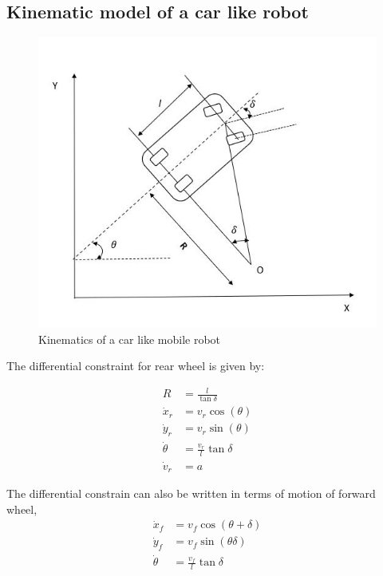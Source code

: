 \documentclass[11]{article}
\begin{document}
\subsection{Kinematic model of a car like robot}


\begin{figure}[!ht]
	\centering
	\includegraphics[scale= 0.5]{vehicle_model.png}
	\caption{Kinematics of a car like mobile robot}
	\label{fig:SysArch}
\end{figure}
 
The differential constraint for rear wheel is given by: 

\begin{eqnarray}
R &= \frac{l}{\tan \delta} \\
\dot{x}_r &= v_r \cos (\theta) \\
\dot{y}_r &= v_r \sin (\theta) \\
\dot{\theta} &= \frac{v_r}{l} \tan \delta \\
\dot{v}_r &= a
\end{eqnarray}

The differential constrain can also be written in terms of motion of forward wheel, 
\begin{eqnarray}
    \dot{x}_f &= v_f \cos (\theta + \delta) \\
    \dot{y}_f &= v_f \sin (\theta \delta) \\
    \dot{\theta} &= \frac{v_f}{l} \tan \delta
\end{eqnarray} 
\end{document}

